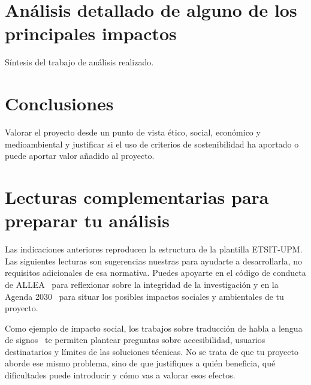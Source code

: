 \section{Análisis detallado de alguno de los principales impactos}
\label{sec:aspectos-eticos-analisis}

Síntesis del trabajo de análisis realizado.

\section{Conclusiones}
\label{sec:aspectos-eticos-conclusiones}

Valorar el proyecto desde un punto de vista ético, social, económico y medioambiental y justificar si el uso de criterios de sostenibilidad ha aportado o puede aportar valor añadido al proyecto.

\section*{Lecturas complementarias para preparar tu análisis}

Las indicaciones anteriores reproducen la estructura de la plantilla ETSIT-UPM. Las siguientes lecturas son sugerencias nuestras para ayudarte a desarrollarla, no requisitos adicionales de esa normativa. Puedes apoyarte en el código de conducta de ALLEA~\cite{allea2023integrity} para reflexionar sobre la integridad de la investigación y en la Agenda 2030~\cite{un2030agenda} para situar los posibles impactos sociales y ambientales de tu proyecto.

Como ejemplo de impacto social, los trabajos sobre traducción de habla a lengua de signos~\cite{sansegundo2008speech,sansegundo2008proposing} te permiten plantear preguntas sobre accesibilidad, usuarios destinatarios y límites de las soluciones técnicas. No se trata de que tu proyecto aborde ese mismo problema, sino de que justifiques a quién beneficia, qué dificultades puede introducir y cómo vas a valorar esos efectos.

